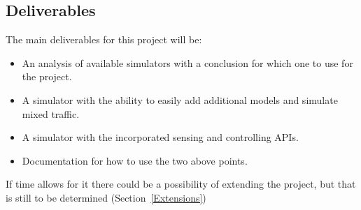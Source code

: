 \subsection{Deliverables}
The main deliverables for this project will be:
\begin{itemize}
    \item An analysis of available simulators with a conclusion for which one to use for the project.
    \item A simulator with the ability to easily add additional models and simulate mixed traffic.
    \item A simulator with the incorporated sensing and controlling APIs.
    \item Documentation for how to use the two above points.
\end{itemize}
If time allows for it there could be a possibility of extending the project, but that is still to be determined (Section~\ref{Extensions}) 
